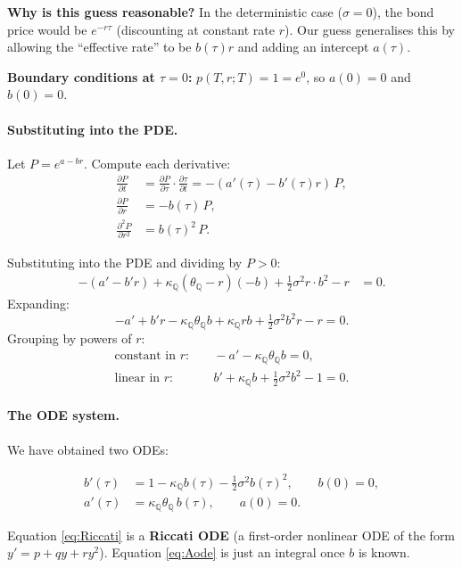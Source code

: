 \documentclass[11pt]{article}
\newcommand{\QQ}{\mathbb{Q}}
\begin{document}
\textbf{Why is this guess reasonable?}  In the deterministic case ($\sigma=0$),
the bond price would be $e^{-r\tau}$ (discounting at constant rate $r$).
Our guess generalises this by allowing the ``effective rate'' to be $b(\tau)r$
and adding an intercept $a(\tau)$.

\textbf{Boundary conditions at $\tau = 0$:}  $p(T,r;T)=1 = e^0$, so
$a(0) = 0$ and $b(0) = 0$.

\paragraph{Substituting into the PDE.}  Let $P = e^{a-br}$.  Compute each
derivative:
\begin{align*}
\frac{\partial P}{\partial t}
&= \frac{\partial P}{\partial\tau}\cdot\frac{\partial\tau}{\partial t}
= -(a'(\tau) - b'(\tau)r)\,P, \\
\frac{\partial P}{\partial r}
&= -b(\tau)\,P, \\
\frac{\partial^2 P}{\partial r^2}
&= b(\tau)^2\,P.
\end{align*}

Substituting into the PDE and dividing by $P > 0$:
\begin{align*}
-(a'-b'r)
+ \kappa_\QQ(\theta_\QQ - r)(-b)
+ \tfrac{1}{2}\sigma^2 r\cdot b^2 - r &= 0.
\end{align*}
Expanding:
\[
-a' + b'r - \kappa_\QQ\theta_\QQ b + \kappa_\QQ r b
+ \tfrac{1}{2}\sigma^2 b^2 r - r = 0.
\]
Grouping by powers of $r$:
\begin{align*}
\text{constant in } r:&\quad
-a' - \kappa_\QQ\theta_\QQ b = 0, \\
\text{linear in } r:&\quad
b' + \kappa_\QQ b + \tfrac{1}{2}\sigma^2 b^2 - 1 = 0.
\end{align*}

\paragraph{The ODE system.}  We have obtained two ODEs:

\begin{align}
b'(\tau) &= 1 - \kappa_\QQ b(\tau) - \tfrac{1}{2}\sigma^2 b(\tau)^2,
\qquad b(0) = 0, \label{eq:Riccati}\\
a'(\tau) &= \kappa_\QQ\theta_\QQ\,b(\tau),
\qquad a(0) = 0. \label{eq:Aode}
\end{align}

Equation \eqref{eq:Riccati} is a \textbf{Riccati ODE} (a first-order
nonlinear ODE of the form $y' = p + qy + ry^2$).  Equation \eqref{eq:Aode}
is just an integral once $b$ is known.
\end{document}
